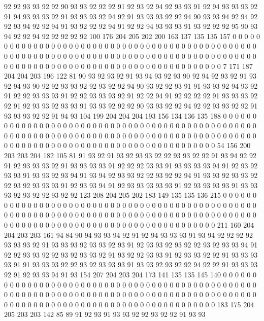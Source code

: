 92 92 93 93 92 92 90 93 93 92 92 92 91 92 93 92 94 92 93 93
91 92 94 93 93 93 92 91 94 93 93 93 92 91 93 93 93 92 94 92
91 93 93 93 92 92 94 90 93 93 94 92 94 92 92 93 94 92 92 94
91 93 92 92 92 94 91 92 92 94 93 93 93 91 93 92 92 92 95 90
93 94 92 92 94 92 92 92 92 92 100 176 204 205 202 200 163 137 135 135
157 0 0 0 0 0 0 0 0 0 0 0 0 0 0 0 0 0 0 0
0 0 0 0 0 0 0 0 0 0 0 0 0 0 0 0 0 0 0 0
0 0 0 0 0 0 0 0 0 0 0 0 0 0 0 0 0 0 0 0
0 0 0 0 0 0 0 0 0 0 0 0 0 0 0 0 0 0 0 0
0 0 0 0 0 0 0 0 0 0 0 0 0 0 0 0 0 0 0 0
0 0 0 0 0 0 0 0 0 0 0 0 0 0 0 0 0 0 0 0
0 0 0 0 0 0 0 0 0 7 171 187 204 204 203 196 122 81 90 93
92 93 92 91 93 94 93 92 93 90 92 94 92 93 92 91 93 92 94 93
90 92 92 93 93 92 92 93 92 92 94 90 93 92 92 93 91 91 93 93
92 94 93 92 91 92 92 93 93 93 91 92 92 93 93 93 92 91 92 92
94 91 92 92 92 92 91 93 93 93 92 92 91 92 93 93 92 93 93 91
93 93 92 92 92 90 93 93 92 92 94 92 92 93 93 92 92 91 93 93
93 92 92 91 94 93 104 199 204 204 204 193 156 134 136 135 188 0 0 0
0 0 0 0 0 0 0 0 0 0 0 0 0 0 0 0 0 0 0 0
0 0 0 0 0 0 0 0 0 0 0 0 0 0 0 0 0 0 0 0
0 0 0 0 0 0 0 0 0 0 0 0 0 0 0 0 0 0 0 0
0 0 0 0 0 0 0 0 0 0 0 0 0 0 0 0 0 0 0 0
0 0 0 0 0 0 0 0 0 0 0 0 0 0 0 0 0 0 0 0
0 0 0 0 0 0 0 0 0 0 0 0 0 0 0 0 0 0 0 0
0 0 0 0 0 54 156 200 203 203 204 182 105 81 91 93 92 91 93 92
93 93 92 92 93 93 92 92 91 93 94 92 92 91 92 93 93 93 92 91
93 93 93 93 91 92 92 92 93 93 91 93 93 93 93 94 91 92 93 92
93 93 91 93 93 92 93 94 91 93 94 92 93 93 92 92 93 92 92 94
91 93 93 92 93 93 92 92 93 92 93 93 93 91 92 93 93 94 91 92
93 93 93 93 93 91 92 93 93 93 93 91 93 93 93 92 93 92 92 93
92 92 123 208 204 205 202 183 149 135 135 136 215 0 0 0 0 0 0 0
0 0 0 0 0 0 0 0 0 0 0 0 0 0 0 0 0 0 0 0
0 0 0 0 0 0 0 0 0 0 0 0 0 0 0 0 0 0 0 0
0 0 0 0 0 0 0 0 0 0 0 0 0 0 0 0 0 0 0 0
0 0 0 0 0 0 0 0 0 0 0 0 0 0 0 0 0 0 0 0
0 0 0 0 0 0 0 0 0 0 0 0 0 0 0 0 0 0 0 0
0 0 0 0 0 0 0 0 0 0 0 0 0 0 0 0 0 0 0 0
0 211 160 204 204 203 203 161 94 84 90 94 93 93 94 92 91 92 94 93
93 93 91 93 94 92 92 92 92 93 93 93 92 91 93 93 93 92 93 93
92 93 91 92 93 93 92 93 92 92 93 92 93 93 94 91 92 92 93 93
92 92 93 92 93 93 92 91 93 92 92 93 93 91 92 93 93 92 92 91
93 93 93 93 91 91 93 93 93 92 92 93 92 93 93 93 91 93 93 92
93 92 92 94 92 92 91 93 93 93 92 91 92 93 93 94 91 93 154 207
204 203 204 173 141 135 135 145 140 0 0 0 0 0 0 0 0 0 0 0
0 0 0 0 0 0 0 0 0 0 0 0 0 0 0 0 0 0 0 0
0 0 0 0 0 0 0 0 0 0 0 0 0 0 0 0 0 0 0 0
0 0 0 0 0 0 0 0 0 0 0 0 0 0 0 0 0 0 0 0
0 0 0 0 0 0 0 0 0 0 0 0 0 0 0 0 0 0 0 0
0 0 0 0 0 0 0 0 0 0 0 0 0 0 0 0 0 0 0 0
0 0 0 0 0 0 0 0 0 0 0 0 0 0 0 0 0 183 175 204
205 203 203 142 85 89 91 92 93 91 93 93 92 92 93 92 92 91 93 93
